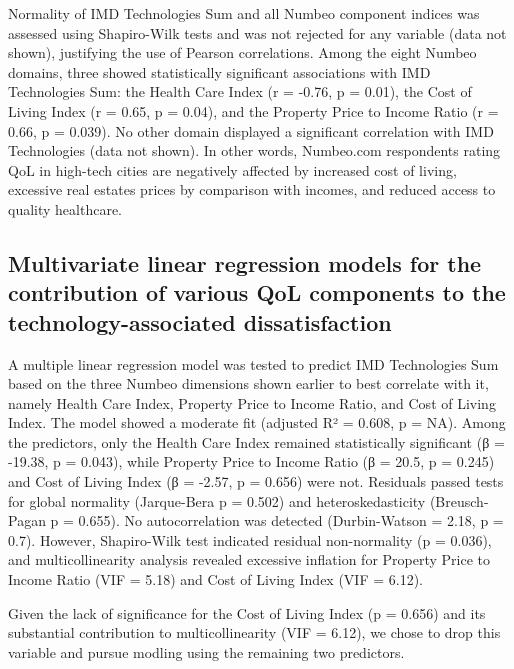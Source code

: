 \documentclass[
  english,
  12pt,
  a4paper,
]{scrartcl}
\begin{document}
Normality of IMD Technologies Sum and all Numbeo component indices was
assessed using Shapiro-Wilk tests and was not rejected for any variable
(data not shown), justifying the use of Pearson correlations. Among the
eight Numbeo domains, three showed statistically significant
associations with IMD Technologies Sum: the Health Care Index (r =
-0.76, p = 0.01), the Cost of Living Index (r = 0.65, p = 0.04), and the
Property Price to Income Ratio (r = 0.66, p = 0.039). No other domain
displayed a significant correlation with IMD Technologies (data not
shown). In other words, Numbeo.com respondents rating QoL in high-tech
cities are negatively affected by increased cost of living, excessive
real estates prices by comparison with incomes, and reduced access to
quality healthcare.

\subsection{Multivariate linear regression models for the contribution
of various QoL components to the technology-associated
dissatisfaction}\label{multivariate-linear-regression-models-for-the-contribution-of-various-qol-components-to-the-technology-associated-dissatisfaction}

A multiple linear regression model was tested to predict IMD
Technologies Sum based on the three Numbeo dimensions shown earlier to
best correlate with it, namely Health Care Index, Property Price to
Income Ratio, and Cost of Living Index. The model showed a moderate fit
(adjusted R² = 0.608, p = NA). Among the predictors, only the Health
Care Index remained statistically significant (β = -19.38, p = 0.043),
while Property Price to Income Ratio (β = 20.5, p = 0.245) and Cost of
Living Index (β = -2.57, p = 0.656) were not. Residuals passed tests for
global normality (Jarque-Bera p = 0.502) and heteroskedasticity
(Breusch-Pagan p = 0.655). No autocorrelation was detected
(Durbin-Watson = 2.18, p = 0.7). However, Shapiro-Wilk test indicated
residual non-normality (p = 0.036), and multicollinearity analysis
revealed excessive inflation for Property Price to Income Ratio (VIF =
5.18) and Cost of Living Index (VIF = 6.12).

Given the lack of significance for the Cost of Living Index (p = 0.656)
and its substantial contribution to multicollinearity (VIF = 6.12), we
chose to drop this variable and pursue modling using the remaining two
predictors.
\end{document}
